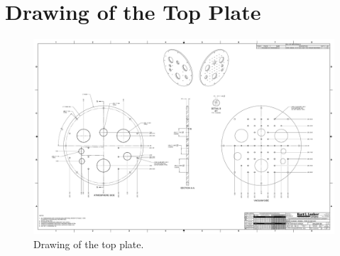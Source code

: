 \section{Drawing of the Top Plate}
\label{app:top_plate_drawing}

\begin{figure}[h]
    \centering
    \includegraphics[width=\textwidth]{fig/TopPlate.pdf}
    \caption{Drawing of the top plate.}
    \label{fig:top_plate}
\end{figure}